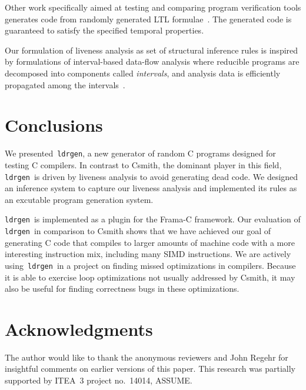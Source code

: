 \documentclass{llncs}
\newcommand\ldrgen{\texttt{ldrgen}}
\begin{document}
Other work specifically aimed at testing and comparing program verification
tools generates code from randomly generated LTL
formulae~\cite{steffen.etal-2014}. The generated code is guaranteed to
satisfy the specified temporal properties.

Our formulation of liveness analysis as set of structural inference rules is
inspired by formulations of interval-based data-flow analysis where
reducible programs are decomposed into components called \emph{intervals},
and analysis data is efficiently propagated among the
intervals~\cite{allen-1970,cocke-1970,graham.wegman-1976}.

\section{Conclusions}

We presented~\ldrgen, a new generator of random C programs designed for
testing C compilers. In contrast to Csmith, the dominant player in this
field, \ldrgen\ is driven by liveness analysis to avoid generating dead
code. We designed an inference system to capture our liveness analysis and
implemented its rules as an excutable program generation system.

\ldrgen\ is implemented as a plugin for the Frama-C framework. Our
evaluation of \ldrgen\ in comparison to Csmith shows that we have achieved
our goal of generating C code that compiles to larger amounts of machine
code with a more interesting instruction mix, including many SIMD
instructions. We are actively using~\ldrgen\ in a project on finding missed
optimizations in compilers. Because it is able to exercise loop
optimizations not usually addressed by Csmith, it may also be useful for
finding correctness bugs in these optimizations.

\section*{Acknowledgments}

The author would like to thank the anonymous reviewers and John Regehr for
insightful comments on earlier versions of this paper.
This research was partially supported by ITEA~3 project no.~14014, ASSUME.




\end{document}

